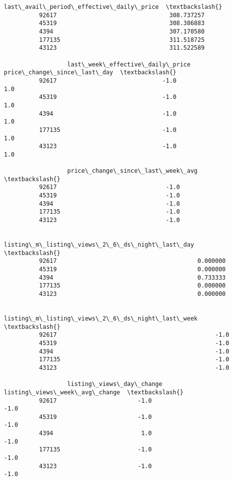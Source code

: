\documentclass[11pt]{article}
\begin{document}
\begin{Verbatim}[commandchars=\\\{\}]
                  last\_avail\_period\_effective\_daily\_price  \textbackslash{}
          92617                                308.737257   
          45319                                308.386883   
          4394                                 307.170580   
          177135                               311.518725   
          43123                                311.522589   
          
                  last\_week\_effective\_daily\_price  price\_change\_since\_last\_day  \textbackslash{}
          92617                              -1.0                          1.0   
          45319                              -1.0                          1.0   
          4394                               -1.0                          1.0   
          177135                             -1.0                          1.0   
          43123                              -1.0                          1.0   
          
                  price\_change\_since\_last\_week\_avg  \textbackslash{}
          92617                               -1.0   
          45319                               -1.0   
          4394                                -1.0   
          177135                              -1.0   
          43123                               -1.0   
          
                  listing\_m\_listing\_views\_2\_6\_ds\_night\_last\_day  \textbackslash{}
          92617                                        0.000000   
          45319                                        0.000000   
          4394                                         0.733333   
          177135                                       0.000000   
          43123                                        0.000000   
          
                  listing\_m\_listing\_views\_2\_6\_ds\_night\_last\_week  \textbackslash{}
          92617                                             -1.0   
          45319                                             -1.0   
          4394                                              -1.0   
          177135                                            -1.0   
          43123                                             -1.0   
          
                  listing\_views\_day\_change  listing\_views\_week\_avg\_change  \textbackslash{}
          92617                       -1.0                           -1.0   
          45319                       -1.0                           -1.0   
          4394                         1.0                           -1.0   
          177135                      -1.0                           -1.0   
          43123                       -1.0                           -1.0   
          

\end{Verbatim}
\end{document}
